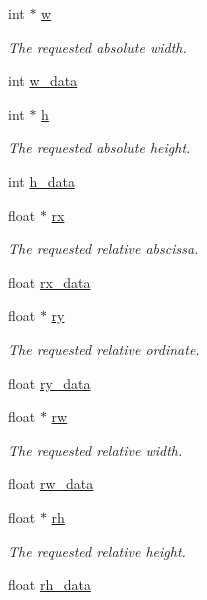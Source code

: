 \begin{DoxyCompactItemize}
int $\ast$ \hyperlink{structei__placer__params__t_a62adb2fa9ee168ab6959d84a3baa4b91}{w}
\begin{DoxyCompactList}\small\item\em The requested absolute width. \end{DoxyCompactList}\item 
int \hyperlink{structei__placer__params__t_ae94c6bc5f4422f5fd7418e7a6e428a8a}{w\-\_\-data}
\item 
int $\ast$ \hyperlink{structei__placer__params__t_ab1f1683f0e5ff5b10881851f7de923b5}{h}
\begin{DoxyCompactList}\small\item\em The requested absolute height. \end{DoxyCompactList}\item 
int \hyperlink{structei__placer__params__t_af2ea394033d83268def0c71659aece7a}{h\-\_\-data}
\item 
float $\ast$ \hyperlink{structei__placer__params__t_a8570c9a80c6f3f0672a667c53348c698}{rx}
\begin{DoxyCompactList}\small\item\em The requested relative abscissa. \end{DoxyCompactList}\item 
float \hyperlink{structei__placer__params__t_a9155db861dc404336cc12888041ecc8d}{rx\-\_\-data}
\item 
float $\ast$ \hyperlink{structei__placer__params__t_a71edc6f4e83a892a55cbe3430d7cf1b7}{ry}
\begin{DoxyCompactList}\small\item\em The requested relative ordinate. \end{DoxyCompactList}\item 
float \hyperlink{structei__placer__params__t_a2055b1dcc667420769afe2121c964242}{ry\-\_\-data}
\item 
float $\ast$ \hyperlink{structei__placer__params__t_a9155d4067029e8c2a1f7a3f0af35036e}{rw}
\begin{DoxyCompactList}\small\item\em The requested relative width. \end{DoxyCompactList}\item 
float \hyperlink{structei__placer__params__t_a6541ed8c3c577fab040286a7d42b4595}{rw\-\_\-data}
\item 
float $\ast$ \hyperlink{structei__placer__params__t_a54a438796f9ce98d6abe1b0406db2981}{rh}
\begin{DoxyCompactList}\small\item\em The requested relative height. \end{DoxyCompactList}\item 
float \hyperlink{structei__placer__params__t_aa4b888e5ade5aff39206f658b8171351}{rh\-\_\-data}
\end{DoxyCompactItemize}


